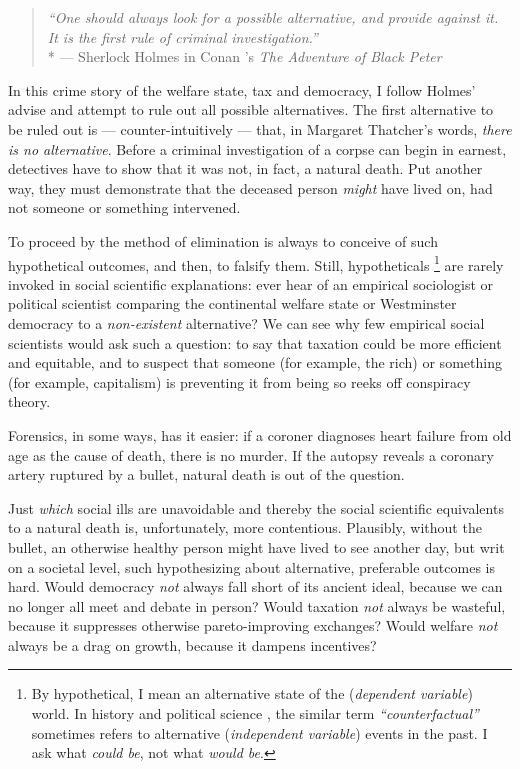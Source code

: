 
\begin{quote}
	\emph{``One should always look for a possible alternative, and provide against it.
	It is the first rule of criminal investigation.''}
	\\*
	--- Sherlock Holmes in Conan \citeauthor{Doyle1904}'s \emph{The Adventure of Black Peter} \citeyearpar[567]{Doyle1904}
\end{quote}

In this crime story of the welfare state, tax and democracy, I follow Holmes' advise and attempt to rule out all possible alternatives.
The first alternative to be ruled out is --- counter-intuitively --- that, in Margaret Thatcher's words, \emph{there is no alternative}.
Before a criminal investigation of a corpse can begin in earnest, detectives have to show that it was not, in fact, a natural death.
Put another way, they must demonstrate that the deceased person \emph{might} have lived on, had not someone or something intervened.

To proceed by the method of elimination is always to conceive of such hypothetical outcomes, and then, to falsify them.
Still, hypotheticals
\footnote{
	By hypothetical, I mean an alternative state of the (\emph{dependent variable}) world.
	In history \citep[recently reviewed by][]{Bunzl2004} and political science \citep[for a methodological appraisal, see][]{Fearon1991}, the similar term \emph{``counterfactual''} sometimes refers to alternative (\emph{independent variable}) events in the past.
	I ask what \emph{could be}, not what \emph{would be}.
}
are rarely invoked in social scientific explanations:
ever hear of an empirical sociologist or political scientist comparing the continental welfare state \citep{Esping-Andersen-1990-aa} or Westminster democracy \citep{Lijphart-1999-aa} to a \emph{non-existent} alternative?
We can see why few empirical social scientists would ask such a question:
to say that taxation could be more efficient and equitable, and to suspect that someone (for example, the rich) or something (for example, capitalism) is preventing it from being so reeks off conspiracy theory.

Forensics, in some ways, has it easier:
if a coroner diagnoses heart failure from old age as the cause of death, there is no murder.
If the autopsy reveals a coronary artery ruptured by a bullet, natural death is out of the question.

Just \emph{which} social ills are unavoidable and thereby the social scientific equivalents to a natural death is, unfortunately, more contentious.
Plausibly, without the bullet, an otherwise healthy person might have lived to see another day, but writ on a societal level, such hypothesizing about alternative, preferable outcomes is hard.
Would democracy \emph{not} always fall short of its ancient ideal, because we can no longer all meet and debate in person?
Would taxation \emph{not} always be wasteful, because it suppresses otherwise pareto-improving exchanges?
Would welfare \emph{not} always be a drag on growth, because it dampens incentives?

